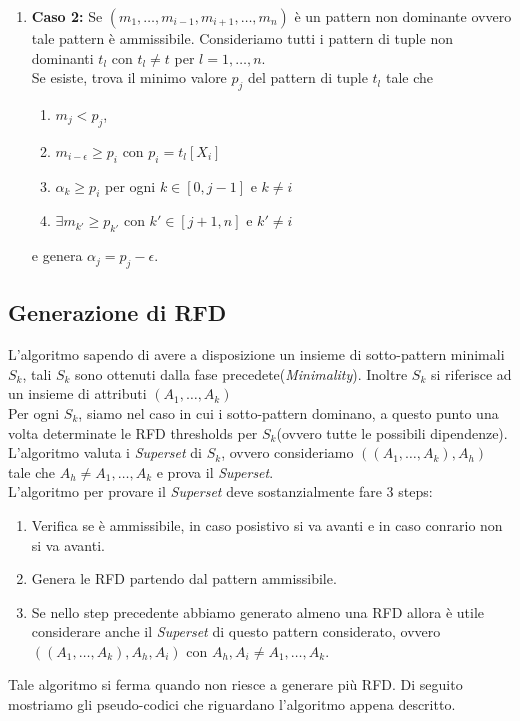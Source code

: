 \begin{itemize}
\begin{enumerate}
				\item  \textbf{Caso 2:} Se $(m_{1},\dots,m_{i-1},m_{i+1},\dots,m_{n})$ è un pattern non dominante ovvero tale pattern è ammissibile.
				Consideriamo tutti i pattern di tuple non dominanti $t_{l}$ con $t_{l}\neq t$ per $l=1,\dots,n$.\\
				Se esiste, trova il minimo valore $p_{j}$ del pattern di tuple $t_{l}$ tale che
				\begin{enumerate}
					\item  $m_{j}<p_{j}$, 
					\item $m_{i-\epsilon} \geq p_{i}$ con $p_{i}=t_{l}[X_{i}]$
					\item $\alpha_{k} \geq p_{i}$ per ogni $k \in [0,j-1]$ e $k \neq i$
					\item $\exists m_{k'} \geq p_{k'}$ con $k' \in [j+1,n]$ e $k' \neq i$
				\end{enumerate}  
				e genera $\alpha_{j}= p_{j} -\epsilon$.\\ 
			\end{enumerate}  		
\end{itemize}

\subsection{Generazione di RFD}
L'algoritmo sapendo di avere a disposizione un insieme di sotto-pattern minimali $S_{k}$, tali $S_{k}$ sono ottenuti dalla fase precedete(\textit{Minimality}). Inoltre $S_{k}$ si riferisce ad un insieme di attributi $(A_{1},\dots,A_{k})$ \\
Per ogni $S_{k}$, siamo nel caso in cui i sotto-pattern dominano, a questo punto una volta determinate le RFD thresholds per $S_{k}$(ovvero tutte le possibili dipendenze). L'algoritmo valuta i \textit{Superset} di $S_{k}$, ovvero consideriamo $((A_{1},\dots,A_{k}),A_{h})$ tale che $A_{h} \neq A_{1},\dots,A_{k}$ e prova il \textit{Superset}.\\ 
L'algoritmo per provare il \textit{Superset} deve sostanzialmente fare 3 steps:
\begin{enumerate}
	\item Verifica se è ammissibile, in caso posistivo si va avanti e in caso conrario non si va avanti.
	\item Genera le RFD partendo dal pattern ammissibile. 
	\item Se nello step precedente abbiamo generato almeno una RFD  allora è utile considerare anche il \textit{Superset} di questo pattern considerato, ovvero $((A_{1},\dots,A_{k}),A_{h},A_{i})$ con $A_{h},A_{i} \neq A_{1},\dots,A_{k}$.
\end{enumerate}
Tale algoritmo si ferma quando non riesce a generare più RFD.
Di seguito mostriamo gli pseudo-codici che riguardano l'algoritmo appena descritto. 

